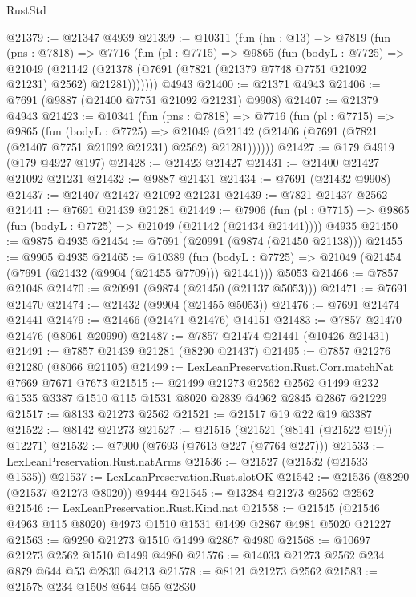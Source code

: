 \begin{lexlean}{RustStd}
\begin{coremodule}
@21379 := @21347 @4939
@21399 := @10311
    (fun (hn : @13) =>
    @7819
      (fun (pns : @7818) =>
      @7716
        (fun (pl : @7715) =>
        @9865
          (fun (bodyL : @7725) =>
          @21049
            (@21142 (@21378 (@7691 (@7821 (@21379 @7748 @7751 @21092 @21231) @2562) @21281)))))))
    @4943
@21400 := @21371 @4943
@21406 := @7691 (@9887 (@21400 @7751 @21092 @21231) @9908)
@21407 := @21379 @4943
@21423 := @10341
    (fun (pns : @7818) =>
    @7716
      (fun (pl : @7715) =>
      @9865
        (fun (bodyL : @7725) =>
        @21049 (@21142 (@21406 (@7691 (@7821 (@21407 @7751 @21092 @21231) @2562) @21281))))))
@21427 := @179 @4919 (@179 @4927 @197)
@21428 := @21423 @21427
@21431 := @21400 @21427 @21092 @21231
@21432 := @9887 @21431
@21434 := @7691 (@21432 @9908)
@21437 := @21407 @21427 @21092 @21231
@21439 := @7821 @21437 @2562
@21441 := @7691 @21439 @21281
@21449 := @7906
    (fun (pl : @7715) => @9865 (fun (bodyL : @7725) => @21049 (@21142 (@21434 @21441))))
    @4935
@21450 := @9875 @4935
@21454 := @7691 (@20991 (@9874 (@21450 @21138)))
@21455 := @9905 @4935
@21465 := @10389
    (fun (bodyL : @7725) => @21049 (@21454 (@7691 (@21432 (@9904 (@21455 @7709))) @21441)))
    @5053
@21466 := @7857 @21048
@21470 := @20991 (@9874 (@21450 (@21137 @5053)))
@21471 := @7691 @21470
@21474 := @21432 (@9904 (@21455 @5053))
@21476 := @7691 @21474 @21441
@21479 := @21466 (@21471 @21476) @14151
@21483 := @7857 @21470 @21476 (@8061 @20990)
@21487 := @7857 @21474 @21441 (@10426 @21431)
@21491 := @7857 @21439 @21281 (@8290 @21437)
@21495 := @7857 @21276 @21280 (@8066 @21105)
@21499 := LexLeanPreservation.Rust.Corr.matchNat @7669 @7671 @7673
@21515 := @21499
    @21273
    @2562
    @2562
    @1499
    @232
    @1535
    @3387
    @1510
    @115
    @1531
    @8020
    @2839
    @4962
    @2845
    @2867
    @21229
@21517 := @8133 @21273 @2562
@21521 := @21517 @19 @22 @19 @3387
@21522 := @8142 @21273
@21527 := @21515 (@21521 (@8141 (@21522 @19)) @12271)
@21532 := @7900 (@7693 (@7613 @227 (@7764 @227)))
@21533 := LexLeanPreservation.Rust.natArms
@21536 := @21527 (@21532 (@21533 @1535))
@21537 := LexLeanPreservation.Rust.slotOK
@21542 := @21536 (@8290 (@21537 @21273 @8020)) @9444
@21545 := @13284 @21273 @2562 @2562
@21546 := LexLeanPreservation.Rust.Kind.nat
@21558 := @21545 (@21546 @4963 @115 @8020) @4973 @1510 @1531 @1499 @2867 @4981 @5020 @21227
@21563 := @9290 @21273 @1510 @1499 @2867 @4980
@21568 := @10697 @21273 @2562 @1510 @1499 @4980
@21576 := @14033 @21273 @2562 @234 @879 @644 @53 @2830 @4213
@21578 := @8121 @21273 @2562
@21583 := @21578 @234 @1508 @644 @55 @2830

\end{coremodule}
\end{lexlean}

